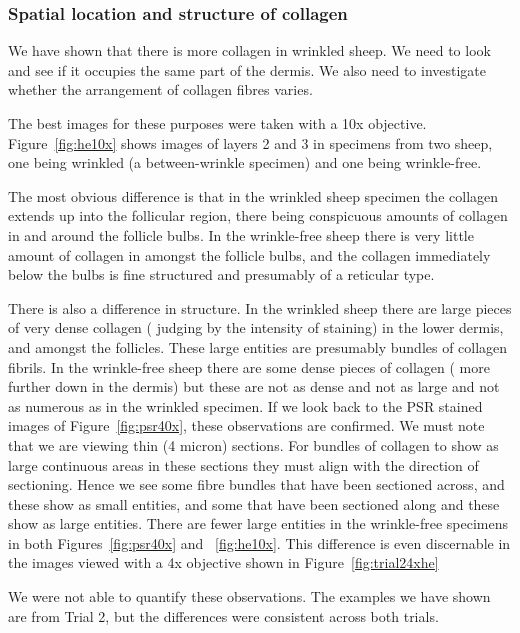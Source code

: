 \documentclass[titlepage]{article}  %
\begin{document}
\subsubsection{Spatial location and structure of collagen}
We have shown that there is more collagen in wrinkled sheep. We need to look and see if it occupies the same part of the dermis. We also need to investigate whether the arrangement of collagen fibres varies.

The best images for these purposes were taken with a 10x objective. Figure~\ref{fig:he10x} shows images of layers 2 and 3 in specimens from two sheep, one being wrinkled (a between-wrinkle specimen) and one being wrinkle-free.

The most obvious difference is that in the wrinkled sheep specimen the collagen extends up into the follicular region, there being conspicuous amounts of collagen in and around the follicle bulbs. In the wrinkle-free sheep there is very little amount of collagen in amongst the follicle bulbs, and the collagen immediately below the bulbs is fine structured and presumably of a reticular type. 

There is also a difference in structure. In the wrinkled sheep there are large pieces of very dense collagen ( judging by the intensity of staining)  in the lower dermis, and amongst the follicles. These large entities are presumably bundles of collagen fibrils. In the wrinkle-free sheep there are some dense pieces of collagen ( more further down in the dermis) but these are not as dense and not as large and not as numerous as in the wrinkled specimen. If we look back to the PSR stained images of Figure~\ref{fig:psr40x}, these observations are confirmed. We must note that we are viewing thin (4 micron) sections. For bundles of collagen to show as large continuous areas in these sections they must align with the direction of sectioning. Hence we see some fibre bundles that have been sectioned across, and these show as small entities, and some that have been sectioned along and these show as large entities. There are fewer large entities in the wrinkle-free specimens in both Figures~\ref{fig:psr40x} and ~\ref{fig:he10x}. This difference is even discernable in the images viewed with a 4x objective shown in Figure~\ref{fig:trial24xhe}

We were not able to quantify these observations. The examples we have shown are from Trial 2, but the differences were consistent across both trials.
\end{document}
